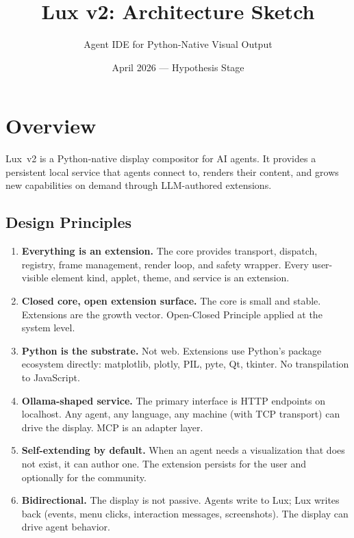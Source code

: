 \documentclass[a4paper,10pt]{article}
\begin{document}
\title{Lux v2: Architecture Sketch}
\author{Agent IDE for Python-Native Visual Output}
\date{April 2026 --- Hypothesis Stage}
\maketitle

\tableofcontents
\newpage

\section{Overview}

Lux~v2 is a Python-native display compositor for AI agents.  It
provides a persistent local service that agents connect to, renders
their content, and grows new capabilities on demand through
LLM-authored extensions.

\subsection{Design Principles}

\begin{enumerate}[label=\textbf{P\arabic*}.]
  \item \textbf{Everything is an extension.}  The core provides
    transport, dispatch, registry, frame management, render loop, and
    safety wrapper.  Every user-visible element kind, applet, theme,
    and service is an extension.
  \item \textbf{Closed core, open extension surface.}  The core is
    small and stable.  Extensions are the growth vector.  Open-Closed
    Principle applied at the system level.
  \item \textbf{Python is the substrate.}  Not web.  Extensions use
    Python's package ecosystem directly: matplotlib, plotly, PIL,
    pyte, Qt, tkinter.  No transpilation to JavaScript.
  \item \textbf{Ollama-shaped service.}  The primary interface is HTTP
    endpoints on localhost.  Any agent, any language, any machine
    (with TCP transport) can drive the display.  MCP is an adapter
    layer.
  \item \textbf{Self-extending by default.}  When an agent needs a
    visualization that does not exist, it can author one.  The
    extension persists for the user and optionally for the community.
  \item \textbf{Bidirectional.}  The display is not passive.  Agents
    write to Lux; Lux writes back (events, menu clicks, interaction
    messages, screenshots).  The display can drive agent behavior.
\end{enumerate}
\end{document}
